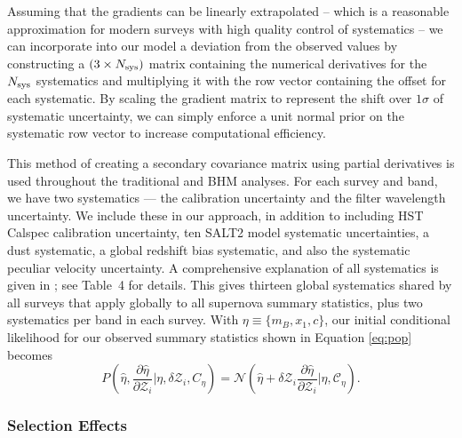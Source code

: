 \documentclass[a4paper,fleqn,usenatbib,manuscript]{emulateapj}
\newcommand{\blue}{\color{blue}}
\newcommand{\cov}{\mathcal{C}_\eta}
\newcommand{\Z}{\mathcal{Z}}
\begin{document}
Assuming that the gradients can be linearly extrapolated -- which is a reasonable approximation for modern surveys with high quality control of systematics -- we can incorporate into our model a deviation from the observed values by constructing a $(3 \times N_{\rm sys})$ matrix containing the numerical derivatives for the $N_{\rm sys}$ systematics and multiplying it with the row vector containing the offset for each systematic. By scaling the gradient matrix to represent the shift over $1\sigma$ of systematic uncertainty, we can simply enforce a unit normal prior on the systematic row vector to increase computational efficiency.

This method of creating a secondary covariance matrix using partial derivatives is used throughout the traditional and BHM analyses. For each survey and band, we have two systematics --- the calibration uncertainty and the filter wavelength uncertainty. We include these in our approach, in addition to including HST Calspec calibration uncertainty, ten SALT2 model systematic uncertainties, a dust systematic, a global redshift bias systematic, and also the systematic peculiar velocity uncertainty. A comprehensive explanation of all systematics is given in \citet{Brout18SYS}; see Table~4 for details. This gives thirteen global systematics shared by {\blue all surveys that apply globally to all supernova summary statistics}, plus two systematics per band in each survey. With $\eta \equiv \lbrace m_B, x_1, c \rbrace$, our initial conditional likelihood for our observed summary statistics shown in Equation \eqref{eq:pop} becomes
\begin{equation}
P\left(\hat{\eta}, \frac{\partial \hat{\eta}}{\partial \Z_i} | \eta, \delta \Z_i, C_\eta\right) = \mathcal{N}\left(\hat{\eta} + \delta \Z_i \frac{\partial \hat{\eta}}{\partial \Z_i}|\eta,\cov\right). \label{eq:l3}
\end{equation}




\subsubsection{Selection Effects}
\label{sec:selection}
\end{document}

